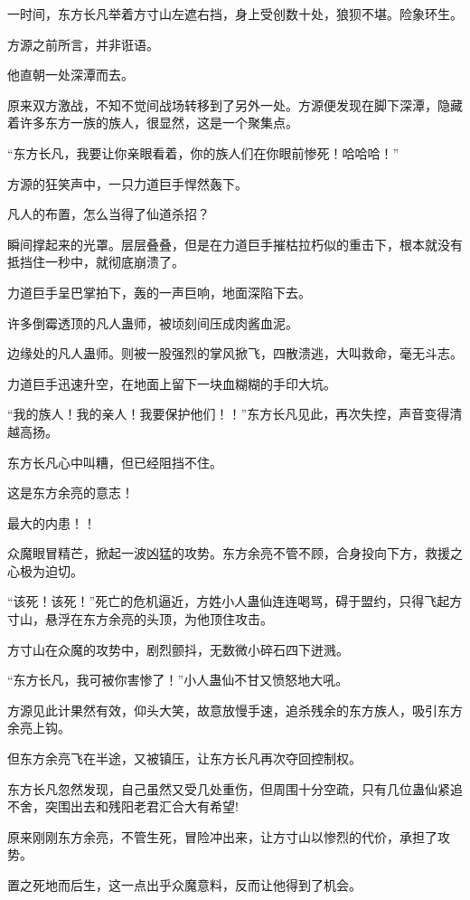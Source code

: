 \begin{this_body}
一时间，东方长凡举着方寸山左遮右挡，身上受创数十处，狼狈不堪。险象环生。

方源之前所言，并非诳语。

他直朝一处深潭而去。

原来双方激战，不知不觉间战场转移到了另外一处。方源便发现在脚下深潭，隐藏着许多东方一族的族人，很显然，这是一个聚集点。

“东方长凡，我要让你亲眼看着，你的族人们在你眼前惨死！哈哈哈！”

方源的狂笑声中，一只力道巨手悍然轰下。

凡人的布置，怎么当得了仙道杀招？

瞬间撑起来的光罩。层层叠叠，但是在力道巨手摧枯拉朽似的重击下，根本就没有抵挡住一秒中，就彻底崩溃了。

力道巨手呈巴掌拍下，轰的一声巨响，地面深陷下去。

许多倒霉透顶的凡人蛊师，被顷刻间压成肉酱血泥。

边缘处的凡人蛊师。则被一股强烈的掌风掀飞，四散溃逃，大叫救命，毫无斗志。

力道巨手迅速升空，在地面上留下一块血糊糊的手印大坑。

“我的族人！我的亲人！我要保护他们！！”东方长凡见此，再次失控，声音变得清越高扬。

东方长凡心中叫糟，但已经阻挡不住。

这是东方余亮的意志！

最大的内患！！

众魔眼冒精芒，掀起一波凶猛的攻势。东方余亮不管不顾，合身投向下方，救援之心极为迫切。

“该死！该死！”死亡的危机逼近，方姓小人蛊仙连连喝骂，碍于盟约，只得飞起方寸山，悬浮在东方余亮的头顶，为他顶住攻击。

方寸山在众魔的攻势中，剧烈颤抖，无数微小碎石四下迸溅。

“东方长凡，我可被你害惨了！”小人蛊仙不甘又愤怒地大吼。

方源见此计果然有效，仰头大笑，故意放慢手速，追杀残余的东方族人，吸引东方余亮上钩。

但东方余亮飞在半途，又被镇压，让东方长凡再次夺回控制权。

东方长凡忽然发现，自己虽然又受几处重伤，但周围十分空疏，只有几位蛊仙紧追不舍，突围出去和残阳老君汇合大有希望!

原来刚刚东方余亮，不管生死，冒险冲出来，让方寸山以惨烈的代价，承担了攻势。

置之死地而后生，这一点出乎众魔意料，反而让他得到了机会。


\end{this_body}
